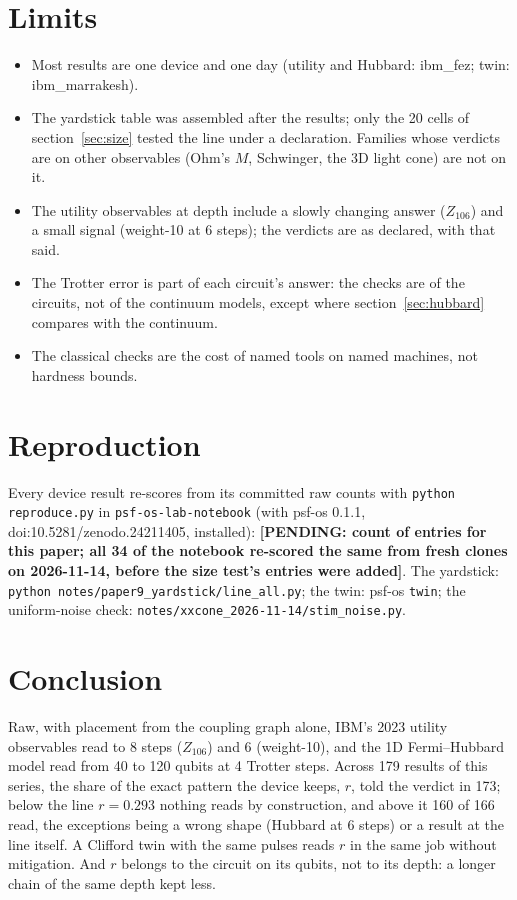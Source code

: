 \documentclass[10pt,a4paper]{article}
\newcommand{\pending}[1]{\textbf{[PENDING: #1]}}
\begin{document}
\section{Limits}\label{sec:limits}
\begin{itemize}
\item Most results are one device and one day (utility and Hubbard: ibm\_fez; twin: ibm\_marrakesh).
\item The yardstick table was assembled after the results; only the 20 cells of section~\ref{sec:size} tested the line
under a declaration. Families whose verdicts are on other observables (Ohm's $M$, Schwinger, the 3D light cone) are not
on it.
\item The utility observables at depth include a slowly changing answer ($Z_{106}$) and a small signal (weight-10 at 6
steps); the verdicts are as declared, with that said.
\item The Trotter error is part of each circuit's answer: the checks are of the circuits, not of the continuum models,
except where section~\ref{sec:hubbard} compares with the continuum.
\item The classical checks are the cost of named tools on named machines, not hardness bounds.
\end{itemize}

\section{Reproduction}\label{sec:repro}
Every device result re-scores from its committed raw counts with \texttt{python reproduce.py} in
\texttt{psf-os-lab-notebook} (with psf-os 0.1.1, doi:10.5281/zenodo.24211405, installed): \pending{count of entries for
this paper; all 34 of the notebook re-scored the same from fresh clones on 2026-11-14, before the size test's entries
were added}. The yardstick: \texttt{python notes/paper9\_yardstick/line\_all.py}; the twin: psf-os \texttt{twin}; the
uniform-noise check: \texttt{notes/xxcone\_2026-11-14/stim\_noise.py}.

\section{Conclusion}
Raw, with placement from the coupling graph alone, IBM's 2023 utility observables read to 8 steps ($Z_{106}$) and
6 (weight-10), and the 1D Fermi--Hubbard model read from 40 to 120 qubits at 4 Trotter steps. Across 179 results of
this series, the share of the exact pattern the device keeps, $r$, told the verdict in 173; below the line
$r = 0.293$ nothing reads by construction, and above it 160 of 166 read, the exceptions being a wrong shape (Hubbard at
6 steps) or a result at the line itself. A Clifford twin with the same pulses reads $r$ in the same job without
mitigation. And $r$ belongs to the circuit on its qubits, not to its depth: a longer chain of the same depth kept less.
\end{document}
